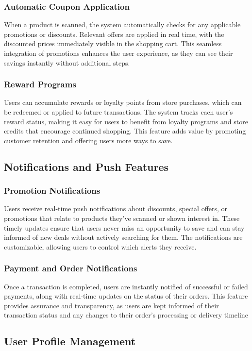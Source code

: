 \documentclass[conference]{IEEEtran}
\begin{document}
\subsubsection{Automatic Coupon Application}
When a product is scanned, the system automatically checks for any applicable promotions or discounts. Relevant offers are applied in real time, with the discounted prices immediately visible in the shopping cart. This seamless integration of promotions enhances the user experience, as they can see their savings instantly without additional steps.
\subsubsection{Reward Programs}
Users can accumulate rewards or loyalty points from store purchases, which can be redeemed or applied to future transactions. The system tracks each user’s reward status, making it easy for users to benefit from loyalty programs and store credits that encourage continued shopping. This feature adds value by promoting customer retention and offering users more ways to save.
\subsection{Notifications and Push Features}
\subsubsection{Promotion Notifications}
Users receive real-time push notifications about discounts, special offers, or promotions that relate to products they’ve scanned or shown interest in. These timely updates ensure that users never miss an opportunity to save and can stay informed of new deals without actively searching for them. The notifications are customizable, allowing users to control which alerts they receive.
\subsubsection{Payment and Order Notifications}
Once a transaction is completed, users are instantly notified of successful or failed payments, along with real-time updates on the status of their orders. This feature provides assurance and transparency, as users are kept informed of their transaction status and any changes to their order’s processing or delivery timeline
\subsection{User Profile Management}
\end{document}
